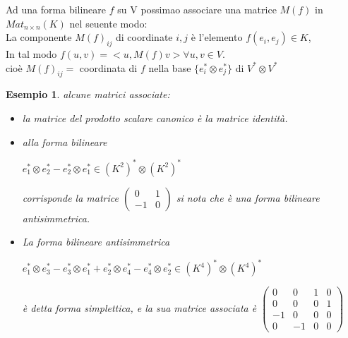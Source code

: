 \documentclass[a4paper,12pt]{article}
\theoremstyle{def}
\theoremstyle{prop}
\theoremstyle{esempio}
\newtheorem*{example}{Esempio}
\theoremstyle{dimostrazione}
\theoremstyle{teo}
\theoremstyle{osservazione}
\begin{document}
Ad una forma bilineare \(f\) su V possimao associare una matrice \(M(f)\) in \(Mat_{n \times n}(K)\) nel seuente modo:\\
La componente \(M(f)_{ij}\) di coordinate \(i, j\) è l'elemento \(f(e_i, e_j) \in K\),\\
In tal modo \(f(u, v) = <u, M(f)v> \forall u, v \in V\).\\
cioè \(M(f)_{ij} =\) coordinata di \(f\) nella base \(\{e_i^* \otimes e_j^*\}\) di \(V^* \otimes V^*\)
\newpage
\begin{example}
	alcune matrici associate:
	\begin{itemize}
		\item la matrice del prodotto scalare canonico è la matrice identità.
		\item alla forma bilineare
		      \begin{center}
			      \(e_1^* \otimes e_2^* - e_2^* \otimes e_1^* \in (K^2)^* \otimes (K^2)^*\)
		      \end{center}
		      corrisponde la matrice 
		      \(\begin{pmatrix}
			      0  & 1  \\
			      -1 & 0
		      \end{pmatrix}\) si nota che è una forma bilineare antisimmetrica.
		\item La forma bilineare antisimmetrica
		      \begin{center}
			      \(e_1^* \otimes e_3^* - e_3^* \otimes e_1^* + e_2^* \otimes e_4^* - e_4^* \otimes e_2^* \in (K^4)^* \otimes (K^4)^*\)
		      \end{center}
		      è detta forma simplettica, e la sua matrice associata è
		      \(\begin{pmatrix}
			      0  & 0  & 1 & 0  \\
			      0  & 0  & 0 & 1  \\
			      -1 & 0  & 0 & 0  \\
			      0  & -1 & 0 & 0
		      \end{pmatrix}\)
	\end{itemize}
\end{example}
\end{document}
